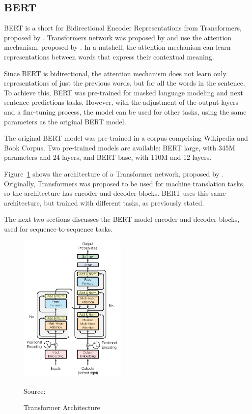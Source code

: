 \documentclass[letterpaper]{article}
\newcommand{\source}[1]{\caption*{Source: {#1}}}
\begin{document}
\subsection{BERT}

BERT is a short for Bidirectional Encoder Representations from Transformers, proposed by \cite{DBLP:journals/corr/abs-1810-04805}. Transformers network was proposed by \cite{DBLP:journals/corr/VaswaniSPUJGKP17} and use the attention mechanism, proposed by \cite{DBLP:journals/corr/BahdanauCB14}. In a nutshell, the attention mechanism can learn representations between words that express their contextual meaning.

Since BERT is bidirectional, the attention mechanism does not learn only representations of just the previous words, but for all the words in the sentence. To achieve this, BERT was pre-trained for masked language modeling and next sentence predictions tasks. However, with the adjustment of the output layers and a fine-tuning process, the model can be used for other tasks, using the same parameters as the original BERT model.

The original BERT model was pre-trained in a corpus comprising Wikipedia and Book Corpus. Two pre-trained models are available: BERT large, with \num{345}{M} parameters and 24 layers, and BERT base, with \num{110}{M} and 12 layers.

Figure~\ref{fig:transformer} shows the architecture of a Transformer network, proposed by \cite{DBLP:journals/corr/VaswaniSPUJGKP17}. Originally, Transformers was proposed to be used for machine translation tasks, so the architecture has encoder and decoder blocks. BERT uses this same architecture, but trained with different tasks, as previously stated.

The next two sections discusses the BERT model encoder and decoder blocks, used for sequence-to-sequence tasks.

\begin{figure}[ht]
    \centering
    \includegraphics[width=0.47\textwidth]{../images/transformer_architecture.png}
    \caption{Transformer Architecture}
    \label{fig:transformer}
    \source{\cite{DBLP:journals/corr/VaswaniSPUJGKP17}}
\end{figure}
\end{document}
